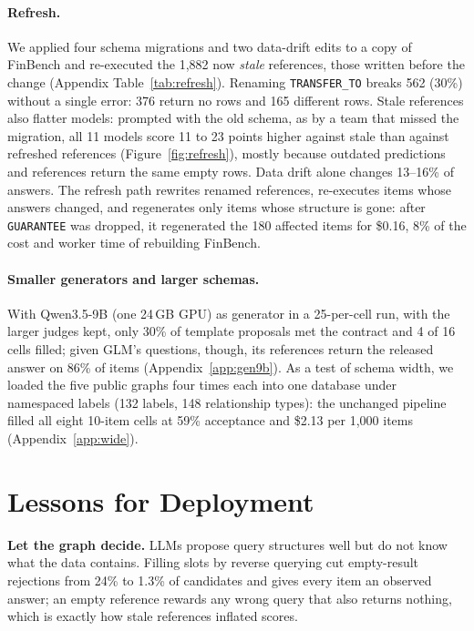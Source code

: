 \documentclass[11pt]{article}
\newcommand{\cy}[1]{\texttt{\small #1}}
\begin{document}
\paragraph{Refresh.} We applied four schema migrations and two data-drift edits to a copy of FinBench and re-executed the 1,882 now \emph{stale} references, those written before the change (Appendix Table~\ref{tab:refresh}). Renaming \cy{TRANSFER\_TO} breaks 562 (30\%) without a single error: 376 return no rows and 165 different rows.
Stale references also flatter models: prompted with the old schema, as by a team that missed the migration, all 11 models score 11 to 23 points higher against stale than against refreshed references (Figure~\ref{fig:refresh}), mostly because outdated predictions and references return the same empty rows. Data drift alone changes 13--16\% of answers. The refresh path rewrites renamed references, re-executes items whose answers changed, and regenerates only items whose structure is gone: after \cy{GUARANTEE} was dropped, it regenerated the 180 affected items for \$0.16, 8\% of the cost and worker time of rebuilding FinBench.

\paragraph{Smaller generators and larger schemas.} With Qwen3.5-9B (one 24\,GB GPU) as generator in a 25-per-cell run, with the larger judges kept, only 30\% of template proposals met the contract and 4 of 16 cells filled; given GLM's questions, though, its references return the released answer on 86\% of items (Appendix~\ref{app:gen9b}). As a test of schema width, we loaded the five public graphs four times each into one database under namespaced labels (132 labels, 148 relationship types): the unchanged pipeline filled all eight 10-item cells at 59\% acceptance and \$2.13 per 1,000 items (Appendix~\ref{app:wide}).


\section{Lessons for Deployment}
\label{sec:lessons}
\textbf{Let the graph decide.} LLMs propose query structures well but do not know what the data contains. Filling slots by reverse querying cut empty-result rejections from 24\% to 1.3\% of candidates and gives every item an observed answer; an empty reference rewards any wrong query that also returns nothing, which is exactly how stale references inflated scores.
\end{document}

